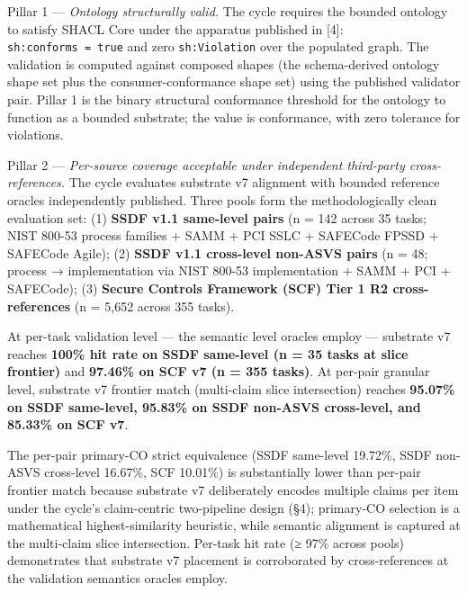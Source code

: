 \documentclass[
]{article}
\begin{document}
Pillar 1 --- \emph{Ontology structurally valid.} The cycle requires the
bounded ontology to satisfy SHACL Core under the apparatus published in
{[}4{]}: \texttt{sh:conforms\ =\ true} and zero \texttt{sh:Violation}
over the populated graph. The validation is computed against composed
shapes (the schema-derived ontology shape set plus the
consumer-conformance shape set) using the published validator pair.
Pillar 1 is the binary structural conformance threshold for the ontology
to function as a bounded substrate; the value is conformance, with zero
tolerance for violations.

Pillar 2 --- \emph{Per-source coverage acceptable under independent
third-party cross-references.} The cycle evaluates substrate v7
alignment with bounded reference oracles independently published. Three
pools form the methodologically clean evaluation set: (1) \textbf{SSDF
v1.1 same-level pairs} (n = 142 across 35 tasks; NIST 800-53 process
families + SAMM + PCI SSLC + SAFECode FPSSD + SAFECode Agile); (2)
\textbf{SSDF v1.1 cross-level non-ASVS pairs} (n = 48; process →
implementation via NIST 800-53 implementation + SAMM + PCI + SAFECode);
(3) \textbf{Secure Controls Framework (SCF) Tier 1 R2 cross-references}
(n = 5,652 across 355 tasks).

At per-task validation level --- the semantic level oracles employ ---
substrate v7 reaches \textbf{100\% hit rate on SSDF same-level (n = 35
tasks at slice frontier)} and \textbf{97.46\% on SCF v7 (n = 355
tasks)}. At per-pair granular level, substrate v7 frontier match
(multi-claim slice intersection) reaches \textbf{95.07\% on SSDF
same-level, 95.83\% on SSDF non-ASVS cross-level, and 85.33\% on SCF
v7}.

The per-pair primary-CO strict equivalence (SSDF same-level 19.72\%,
SSDF non-ASVS cross-level 16.67\%, SCF 10.01\%) is substantially lower
than per-pair frontier match because substrate v7 deliberately encodes
multiple claims per item under the cycle's claim-centric two-pipeline
design (§4); primary-CO selection is a mathematical highest-similarity
heuristic, while semantic alignment is captured at the multi-claim slice
intersection. Per-task hit rate (≥ 97\% across pools) demonstrates that
substrate v7 placement is corroborated by cross-references at the
validation semantics oracles employ.
\end{document}
